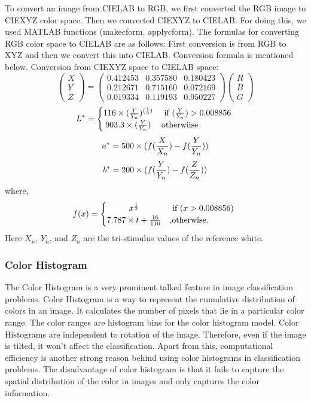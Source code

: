 To convert an image from CIELAB to RGB, we first converted the RGB image to CIEXYZ color space. Then we converted CIEXYZ to CIELAB. 
For doing this, we used MATLAB functions (makecform, applycform). The formulas for converting RGB color space to CIELAB are as follows:
First conversion is from RGB to XYZ and then we convert this into CIELAB. Conversion formula is mentioned below. 
Conversion from CIEXYZ space to CIELAB space:
		 $$ \left( \begin{array}{c} X \\ Y \\ Z \end{array} \right) =  \left( \begin{array}{ccc} 0.412453 & 0.357580 & 0.180423 \\ 0.212671 & 0.715160 & 0.072169 \\ 0.019334 & 0.119193 & 0.950227 \end{array} \right) \left( \begin{array}{c} R \\ B \\ G \end{array} \right)$$
		 \[
L^{*} =
  \begin{cases} 
      \hfill 116 \times (\frac{Y}{Y_n})^{({\frac{1}{3}})}    \hfill & \text{ if $(\frac{Y}{Y_n}) > 0.008856$ } \\
      \hfill 903.3 \times (\frac{Y}{Y_n}) \hfill & \text{otherwiise} \\
  \end{cases}
\]
 \[  a^* = 500 \times (f(\frac{X}{X_n})-f(\frac{Y}{Y_n})) \\ \]
   \[  b^* = 200 \times (f(\frac{Y}{Y_n})-f(\frac{Z}{Z_n}))\\ \]
 where,
  \[
  f(x)=
   \begin{cases} 
   \hfill x^{\frac{1}{3}} \hfill & \text{ if $( x > 0.008856)$ } \\
   \hfill 7.787 \times t + \frac{16}{116} \hfill & \text{,otherwise.} \\
   \end{cases}
  \]
 Here $X_n$, $Y_n$, and $Z_n$ are the tri-stimulus values of the 
reference white. 

\subsubsection*{Color Histogram}
The Color Histogram is a very prominent talked feature in image classification problems. Color Histogram is a way to represent the cumulative distribution of colors in an image. It calculates the number of pixels that lie in a particular color range. The color ranges are histogram bins for the color histogram model. Color Histograms are independent to rotation of the image. Therefore, even if the image is 
tilted, it won't affect the classification. Apart from this, computational efficiency is another strong reason behind using color histograms in classification problems. The disadvantage of color histogram is that it fails to capture the spatial distribution of the color in images and only captures the color information.

